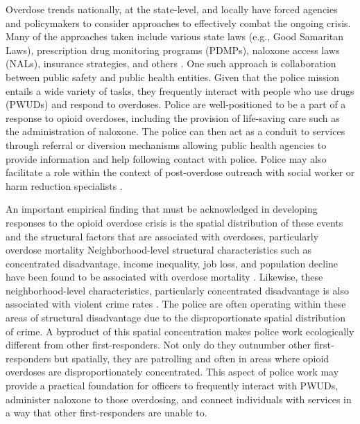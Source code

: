 Overdose trends nationally, at the state-level, and locally have forced agencies and policymakers to consider approaches to effectively combat the ongoing crisis. Many of the approaches taken include various state laws (e.g., Good Samaritan Laws), prescription drug monitoring programs (PDMPs), naloxone access laws (NALs), insurance strategies, and others \parencite{haegerich_evidence_2019}. One such approach is collaboration between public safety and public health entities. Given that the police mission entails a wide variety of tasks, they frequently interact with people who use drugs (PWUDs) and respond to overdoses. Police are well-positioned to be a part of a response to opioid overdoses, including the provision of life-saving care such as the administration of naloxone. The police can then act as a conduit to services through referral or diversion mechanisms allowing public health agencies to provide information and help following contact with police.  Police may also facilitate a role within the context of post-overdose outreach with social worker or harm reduction specialists \parencite{bagley_scoping_2019}.

An important empirical finding that must be acknowledged in developing responses to the opioid overdose crisis is the spatial distribution of these events and the structural factors that are associated with overdoses, particularly overdose mortality Neighborhood-level structural characteristics such as concentrated disadvantage, income inequality, job loss, and population decline have been found to be associated with overdose mortality \parencite{carter_spatial_2019, feldmeyer_community_2022, ford_neighborhood_2017, piza_drug_2023}. Likewise, these neighborhood-level characteristics, particularly concentrated disadvantage is also associated with violent crime rates \parencite{peterson_divergent_2010}. The police are often operating within these areas of structural disadvantage due to the disproportionate spatial distribution of crime. A byproduct of this spatial concentration makes police work ecologically different from other first-responders. Not only do they outnumber other first-responders \parencite{lurigio_opioid_2018} but spatially, they are patrolling and often in areas where opioid overdoses are disproportionately concentrated. This aspect of police work may provide a practical foundation for officers to frequently interact with PWUDs, administer naloxone to those overdosing, and connect individuals with services in a way that other first-responders are unable to.

